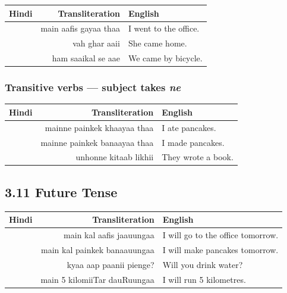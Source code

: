 
\begin{tabular}{@{}HRG@{}}
  \toprule
  Hindi & Transliteration & English \\
  \midrule
                    & main aafis gayaa thaa               & I went to the office. \\
                           & vah ghar aaii                       & She came home. \\
                    & ham saaikal se aae                  & We came by bicycle. \\
  \bottomrule
\end{tabular}

\subsubsection*{Transitive verbs — subject takes \textit{ne}}


\begin{tabular}{@{}HRG@{}}
  \toprule
  Hindi & Transliteration & English \\
  \midrule
               & mainne painkek khaayaa thaa         & I ate pancakes. \\
              & mainne painkek banaayaa thaa        & I made pancakes. \\
                & unhonne kitaab likhii                & They wrote a book. \\
  \bottomrule
\end{tabular}

\subsection{3.11 Future Tense}


\begin{tabular}{@{}HRG@{}}
  \toprule
  Hindi & Transliteration & English \\
  \midrule
                & main kal aafis jaauungaa             & I will go to the office tomorrow. \\
             & main kal painkek banaauungaa         & I will make pancakes tomorrow. \\
                & kyaa aap paanii pienge?             & Will you drink water? \\
           & main 5 kilomiiTar dauRuungaa        & I will run 5 kilometres. \\
  \bottomrule
\end{tabular}


